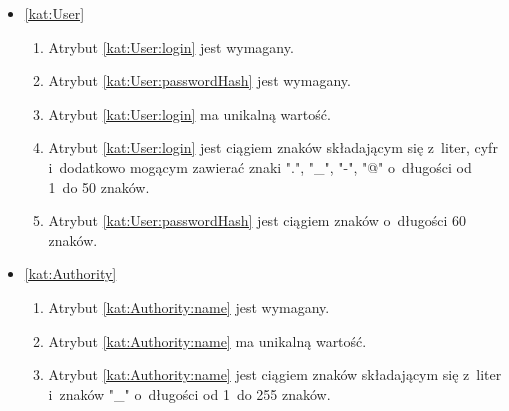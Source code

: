 \begin{itemize}[label={\textbf{Ograniczenia dla}}, wide, labelwidth=!, labelindent=0pt]
    \setlength\itemsep{1.75em}
    \item\ref{kat:User}\mynobreakpar
    \begin{enumerate}[label={\textbf{OGR/\protect\threedigits{\arabic{enumi}}}}, wide, labelwidth=!, align=left, leftmargin=3cm]
        \item Atrybut \ref{kat:User:login} jest wymagany.
        \item Atrybut \ref{kat:User:passwordHash} jest wymagany.
        \item Atrybut \ref{kat:User:login} ma unikalną wartość.
        \item Atrybut \ref{kat:User:login} jest ciągiem znaków składającym się z~liter, cyfr i~dodatkowo mogącym zawierać znaki ".", "\_", "-", "@" o~długości od 1~do 50 znaków.
        \item Atrybut \ref{kat:User:passwordHash} jest ciągiem znaków o~długości 60 znaków.
    \end{enumerate}
    \item\ref{kat:Authority}\mynobreakpar
    \begin{enumerate}[label={\textbf{OGR/\protect\threedigits{\arabic{enumi}}}}, wide, labelwidth=!, align=left, leftmargin=3cm, resume]
        \item Atrybut \ref{kat:Authority:name} jest wymagany.
        \item Atrybut \ref{kat:Authority:name} ma unikalną wartość.
        \item Atrybut \ref{kat:Authority:name} jest ciągiem znaków składającym się z~liter i~znaków "\_" o~długości od 1~do 255 znaków.
    \end{enumerate}

\end{itemize}

\thispagestyle{normal}
